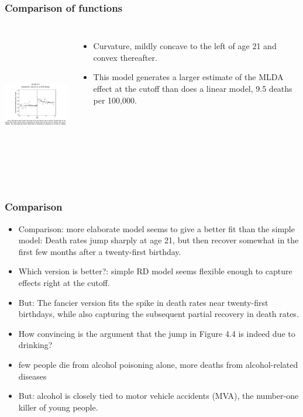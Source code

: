\documentclass{beamer}
\begin{document}
\begin{frame}
\frametitle{Comparison of functions}
\begin{columns}
\includegraphics[width=6cm,height=6.5cm,keepaspectratio]{Figure 4.4} 

\begin{itemize}
	\item Curvature, mildly concave to the left of age 21 and convex thereafter. 
	\item This model generates a larger estimate of the MLDA effect at the cutoff than does a linear model, 9.5 deaths per 100,000.
\end{itemize}
\end{columns}	
\end{frame}
\begin{frame}
\frametitle{Comparison}
\begin{itemize}
	\item Comparison: more elaborate model seems to give a better fit than the simple model: Death rates jump sharply at age 21, but then recover somewhat in the first few months after a twenty-first birthday.
	\item Which version is better?: simple RD model seems flexible enough to capture effects right at the cutoff.
	\item But: The fancier version fits the spike in death rates near twenty-first birthdays, while also capturing the subsequent partial recovery in death rates.
	\item How convincing is the argument that the jump in Figure 4.4 is indeed due to drinking?
	\item few people die from alcohol poisoning alone, more deaths from alcohol-related diseases
	\item But: alcohol is closely tied to motor vehicle accidents (MVA), the number-one killer of young people.
\end{itemize}

\end{frame}
\end{document}
